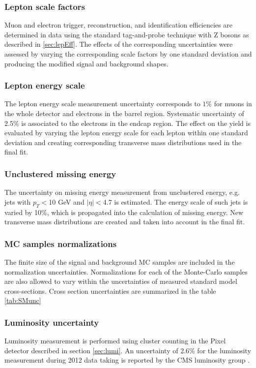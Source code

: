 \subsubsection*{Lepton scale factors}
        Muon and electron trigger, reconstruction, and identification efficiencies are determined in data using the standard tag-and-probe technique with Z bosons as described in \ref{sec:lepEff}. The effects of the corresponding uncertainties were assessed by varying the corresponding scale factors by one standard deviation and producing the modified signal and background shapes. 
\subsubsection*{Lepton energy scale} 
		The lepton energy scale measurement uncertainty corresponds to $1\%$ for muons in the whole detector and electrons in the barrel region. Systematic uncertainty of 2.5$\%$ is associated to the electrons in the endcap region. The effect on the yield is evaluated by varying the lepton energy scale for each lepton within one standard deviation and creating corresponding transverse mass distributions used in the final fit.
\subsubsection*{Unclustered missing energy}
        The uncertainty on missing energy measurement from unclustered energy, e.g. jets with $p_T<$10 GeV and $|\eta|<$4.7 is estimated. The energy scale of such jets is varied by 10$\%$, which is propagated into the calculation of missing energy. New transverse mass distributions are created and taken into account in the final fit.
\subsubsection*{MC samples normalizations}
        The finite size of the signal and background MC samples are included in the normalization uncertainties. Normalizations for each of the Monte-Carlo samples are also allowed to vary within the uncertainties of measured standard model cross-sections. Cross section uncertainties are summarized in the table \ref{tab:SMunc}
\subsubsection*{Luminosity uncertainty}
        Luminosity measurement is performed using cluster counting in the Pixel detector described in section \ref{sec:lumi}. An uncertainty of 2.6$\%$ for the luminosity measurement during 2012 data taking is reported by the CMS luminosity group \cite{CMS-PAS-LUM-13-001}.

